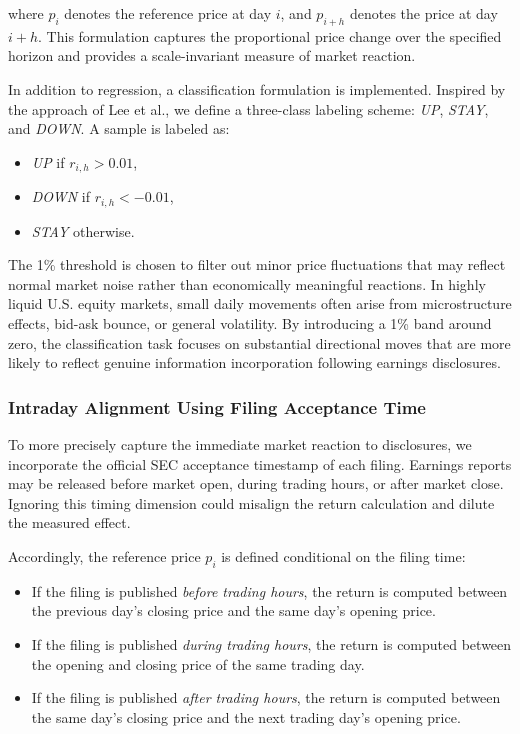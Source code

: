 where $p_i$ denotes the reference price at day $i$, and $p_{i+h}$ denotes the price at day $i+h$. This formulation captures the proportional price change over the specified horizon and provides a scale-invariant measure of market reaction.

In addition to regression, a classification formulation is implemented. Inspired by the approach of Lee et al.\cite{lee-etal-2014-importance}, we define a three-class labeling scheme: \textit{UP}, \textit{STAY}, and \textit{DOWN}. A sample is labeled as:

\begin{itemize}
    \item \textit{UP} if $r_{i,h} > 0.01$,
    \item \textit{DOWN} if $r_{i,h} < -0.01$,
    \item \textit{STAY} otherwise.
\end{itemize}

The 1\% threshold is chosen to filter out minor price fluctuations that may reflect normal market noise rather than economically meaningful reactions. In highly liquid U.S. equity markets, small daily movements often arise from microstructure effects, bid-ask bounce, or general volatility. By introducing a 1\% band around zero, the classification task focuses on substantial directional moves that are more likely to reflect genuine information incorporation following earnings disclosures.

\subsubsection*{Intraday Alignment Using Filing Acceptance Time}

To more precisely capture the immediate market reaction to disclosures, we incorporate the official SEC acceptance timestamp of each filing. Earnings reports may be released before market open, during trading hours, or after market close. Ignoring this timing dimension could misalign the return calculation and dilute the measured effect.

Accordingly, the reference price $p_i$ is defined conditional on the filing time:

\begin{itemize}
    \item If the filing is published \textit{before trading hours}, the return is computed between the previous day's closing price and the same day's opening price.
    \item If the filing is published \textit{during trading hours}, the return is computed between the opening and closing price of the same trading day.
    \item If the filing is published \textit{after trading hours}, the return is computed between the same day's closing price and the next trading day's opening price.
\end{itemize}

